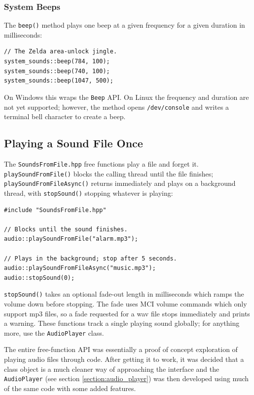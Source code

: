 \subsubsection{System Beeps}

The \texttt{beep()} method plays one beep at a given frequency for a given duration in milliseconds:
\begin{lstlisting}[style=cppstyle]
// The Zelda area-unlock jingle.
system_sounds::beep(784, 100);
system_sounds::beep(740, 100);
system_sounds::beep(1047, 500);
\end{lstlisting}
On Windows this wraps the \texttt{Beep} API. On Linux the frequency and duration are not yet supported; however, the method opens \texttt{/dev/console} and writes a terminal bell character to create a beep.

\subsection{Playing a Sound File Once}

The \texttt{SoundsFromFile.hpp} free functions play a file and forget it. \texttt{playSoundFromFile()} blocks the calling thread until the file finishes; \texttt{playSoundFromFileAsync()} returns immediately and plays on a background thread, with \texttt{stopSound()} stopping whatever is playing:
\begin{lstlisting}[style=cppstyle]
#include "SoundsFromFile.hpp"

// Blocks until the sound finishes.
audio::playSoundFromFile("alarm.mp3");

// Plays in the background; stop after 5 seconds.
audio::playSoundFromFileAsync("music.mp3");
audio::stopSound(0);
\end{lstlisting}
\texttt{stopSound()} takes an optional fade-out length in milliseconds which ramps the volume down before stopping. The fade uses MCI volume commands which only support mp3 files, so a fade requested for a wav file stops immediately and prints a warning. These functions track a single playing sound globally; for anything more, use the \texttt{AudioPlayer} class.

\begin{note}
The entire free-function API was essentially a proof of concept exploration of playing audio files through code. After getting it to work, it was decided that a class object is a much cleaner way of approaching the interface and the \texttt{AudioPlayer} (see section \ref{section:audio_player}) was then developed using much of the same code with some added features.
\end{note}

